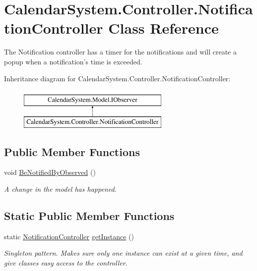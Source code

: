 \hypertarget{class_calendar_system_1_1_controller_1_1_notification_controller}{\section{Calendar\+System.\+Controller.\+Notification\+Controller Class Reference}
\label{class_calendar_system_1_1_controller_1_1_notification_controller}
}


The Notification controller has a timer for the notifications and will create a popup when a notification's time is exceeded.  


Inheritance diagram for Calendar\+System.\+Controller.\+Notification\+Controller\+:\begin{figure}[H]
\begin{center}
\leavevmode
\includegraphics[height=2.000000cm]{class_calendar_system_1_1_controller_1_1_notification_controller}
\end{center}
\end{figure}
\subsection*{Public Member Functions}
\begin{DoxyCompactItemize}
\item 
void \hyperlink{class_calendar_system_1_1_controller_1_1_notification_controller_a1f57126c0b90cb4b4ab54b599d83035c}{Be\+Notified\+By\+Observed} ()
\begin{DoxyCompactList}\small\item\em A change in the model has happened. \end{DoxyCompactList}\end{DoxyCompactItemize}
\subsection*{Static Public Member Functions}
\begin{DoxyCompactItemize}
\item 
static \hyperlink{class_calendar_system_1_1_controller_1_1_notification_controller}{Notification\+Controller} \hyperlink{class_calendar_system_1_1_controller_1_1_notification_controller_aee114fb47d6d78ae8794f2504584e946}{get\+Instance} ()
\begin{DoxyCompactList}\small\item\em Singleton pattern. Makes sure only one instance can exist at a given time, and give classes easy access to the controller. \end{DoxyCompactList}\end{DoxyCompactItemize}


